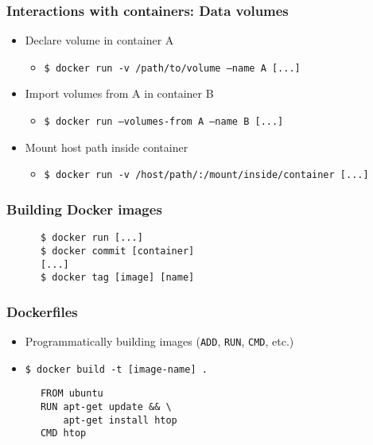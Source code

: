 \documentclass[xetex,mathserif,serif]{beamer}
\begin{document}
  \begin{frame}
    \frametitle{Interactions with containers: Data volumes}
    \begin{itemize}
      \item Declare volume in container A
        \begin{itemize}
          \item \texttt{\$ docker run -v /path/to/volume --name A [...]}
        \end{itemize}
      \item Import volumes from A in container B
        \begin{itemize}
          \item \texttt{\$ docker run --volumes-from A --name B [...]}
        \end{itemize}
      \item Mount host path inside container
        \begin{itemize}
          \item \texttt{\$ docker run -v /host/path/:/mount/inside/container [...]}
        \end{itemize}
    \end{itemize}
  \end{frame}
  \begin{frame}[fragile=singleslide]
    \frametitle{Building Docker images}
    \begin{verbatim}
      $ docker run [...]
      $ docker commit [container]
      [...]
      $ docker tag [image] [name]
    \end{verbatim}
  \end{frame}
  \begin{frame}[fragile=singleslide]
    \frametitle{Dockerfiles}
    \begin{itemize}
      \item Programmatically building images (\texttt{ADD}, \texttt{RUN}, \texttt{CMD}, etc.)
      \item \texttt{\$ docker build -t [image-name] .}
    \end{itemize}
    \begin{verbatim}
      FROM ubuntu
      RUN apt-get update && \
          apt-get install htop
      CMD htop
    \end{verbatim}
  \end{frame}
\end{document}
